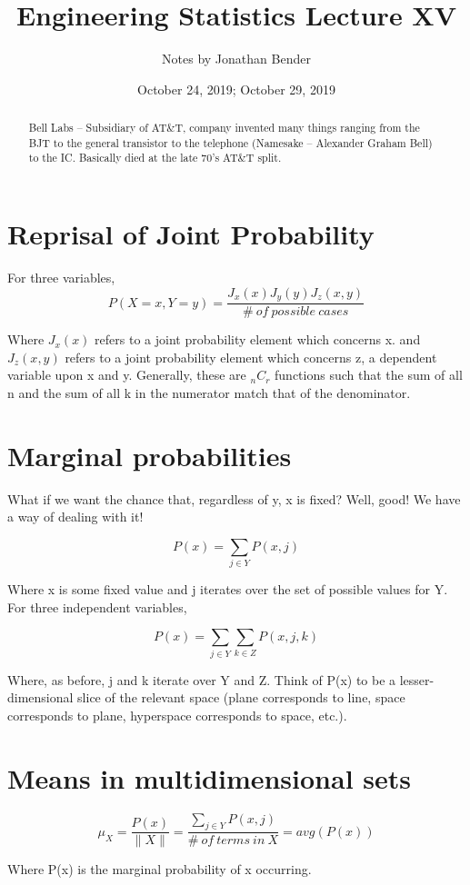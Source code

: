 \documentclass[]{article}
\title{Engineering Statistics Lecture XV}
\author{Notes by Jonathan Bender}
\date{October 24, 2019; October 29, 2019}
\begin{document}
	
	\maketitle
	
	\begin{abstract}
		Bell Labs -- Subsidiary of AT\&T, company invented many things ranging from the BJT to the general transistor to the telephone (Namesake -- Alexander Graham Bell) to the IC. Basically died at the late 70's AT\&T split.
	\end{abstract}
	
	\section{Reprisal of Joint Probability}
		For three variables, $$P(X=x, Y=y) = \dfrac{J_x(x)J_y(y)J_z(x,y)}{\#\ of\ possible\ cases}$$
		
		Where $J_x(x)$ refers to a joint probability element which concerns x. and $J_z(x,y)$ refers to a joint probability element which concerns z, a dependent variable upon x and y.
		Generally, these are $_nC_r$ functions such that the sum of all n and the sum of all k in the numerator match that of the denominator.
	
	\section{Marginal probabilities}
		What if we want the chance that, regardless of y, x is fixed?
		Well, good! We have a way of dealing with it!
		
		$$P(x) = \sum_{j \in Y}P(x,j)$$
		
		Where x is some fixed value and j iterates over the set of possible values for Y.
		For three independent variables,
		
		$$P(x) = \sum_{j \in Y}\sum_{k \in Z}P(x,j,k)$$
		
		Where, as before, j and k iterate over Y and Z. Think of P(x) to be a lesser-dimensional slice of the relevant space (plane corresponds to line, space corresponds to plane, hyperspace corresponds to space, etc.).
	
	\section{Means in multidimensional sets}
		$$\mu_X = \frac{P(x)}{\|X\|} = \dfrac{\sum_{j \in Y}P(x,j)}{\#\ of\ terms\ in\ X} = avg(P(x))$$
		
		Where P(x) is the marginal probability of x occurring.
	
\end{document}
